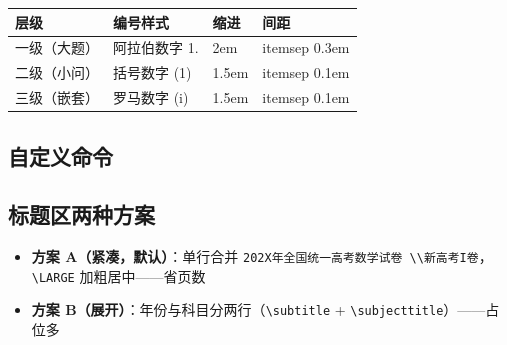 \documentclass[11pt,a4paper]{ctexart}
\begin{document}
\begin{codeblock}
\end{codeblock}

\begin{center}
\begin{tabular}{llll}
\toprule
层级 & 编号样式 & 缩进 & 间距 \\
\midrule
一级（大题） & 阿拉伯数字 1. & 2em   & itemsep 0.3em \\
二级（小问） & 括号数字 (1)  & 1.5em & itemsep 0.1em \\
三级（嵌套） & 罗马数字 (i)  & 1.5em & itemsep 0.1em \\
\bottomrule
\end{tabular}
\end{center}

\subsection{自定义命令}

\begin{codeblock}
\newcommand{\mycircled}[1]{%
  \tikz[baseline=(char.base),outer sep=0pt]{%
    \node[draw,circle,inner sep=0.5pt,minimum size=1.4em,
          line width=0.4pt,font=\zihao{-5}] (char) {#1};%
  }%
}
\newcommand{\Parallel}{\raisebox{0.1ex}{\rotatebox[origin=c]{-20}{$\parallel$}}}
\newcommand{\bigstarraised}{\raisebox{0.2ex}{$\bigstar$}}
\newcommand{\blank}{\underline{\hspace{2cm}}}
\newcommand{\subjecttitle}[1]{{\fontsize{24pt}{22pt}\selectfont\centering\textbf{#1}\par}}
\newcommand{\subtitle}[1]{{\fontsize{16pt}{16pt}\selectfont\centering #1\par}}
\end{codeblock}

\subsection{标题区两种方案}

\begin{itemize}
  \item \textbf{方案 A（紧凑，默认）}：单行合并 \texttt{202X年全国统一高考数学试卷 \textbackslash\textbackslash 新高考I卷}，
        \texttt{\textbackslash LARGE} 加粗居中——省页数
  \item \textbf{方案 B（展开）}：年份与科目分两行（\texttt{\textbackslash subtitle} +
        \texttt{\textbackslash subjecttitle}）——占位多
\end{itemize}
\end{document}
